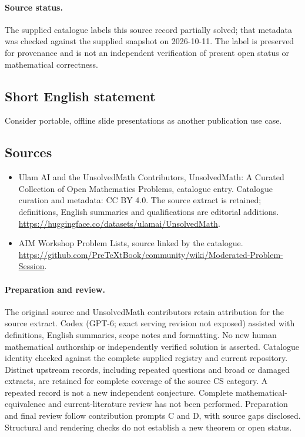 \documentclass[11pt]{article}
\begin{document}
\paragraph{Source status.}
The supplied catalogue labels this source record partially solved; that metadata was checked against the supplied snapshot on 2026-10-11. The label is preserved for provenance and is not an independent verification of present open status or mathematical correctness.
\subsection{Short English statement}
Consider portable, offline slide presentations as another publication use case.
\subsection{Sources}
\begin{itemize}
\item[\hypertarget{source:statement:1}{S1}] Ulam AI and the UnsolvedMath Contributors, UnsolvedMath: A Curated Collection of Open Mathematics Problems, catalogue entry. Catalogue curation and metadata: CC BY 4.0. The source extract is retained; definitions, English summaries and qualifications are editorial additions.
\url{https://huggingface.co/datasets/ulamai/UnsolvedMath}.
\item[\hypertarget{source:statement:2}{S2}] AIM Workshop Problem Lists, source linked by the catalogue.
\url{https://github.com/PreTeXtBook/community/wiki/Moderated-Problem-Session}.
\end{itemize}
\paragraph{Preparation and review.}
The original source and UnsolvedMath contributors retain attribution for the source extract. Codex (GPT-6; exact serving revision not exposed) assisted with definitions, English summaries, scope notes and formatting. No new human mathematical authorship or independently verified solution is asserted. Catalogue identity checked against the complete supplied registry and current repository. Distinct upstream records, including repeated questions and broad or damaged extracts, are retained for complete coverage of the source CS category. A repeated record is not a new independent conjecture. Complete mathematical-equivalence and current-literature review has not been performed. Preparation and final review follow contribution prompts C and D, with source gaps disclosed. Structural and rendering checks do not establish a new theorem or open status.
\label{end:statement}
\end{document}
